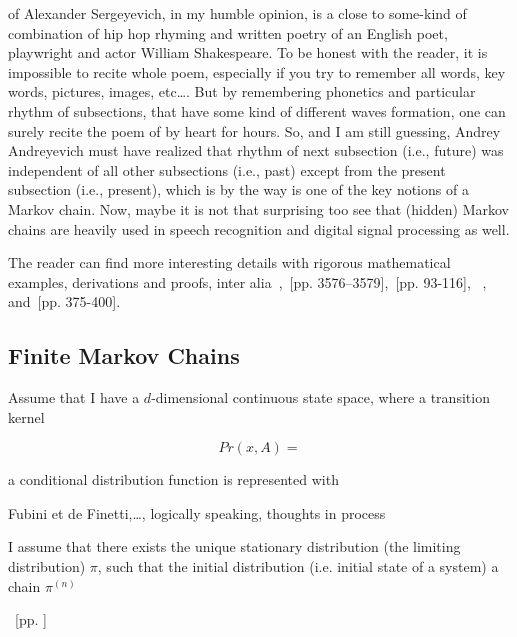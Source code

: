 \documentclass[a4paper,11pt,english]{article}
\begin{document}
		of Alexander Sergeyevich, in my humble opinion, is a close  to some-kind of combination of hip hop rhyming and written poetry of an English poet, 
		playwright and actor William Shakespeare. To be honest with the reader, it is impossible to recite whole poem, especially if you try to remember 
		all words, key words, pictures, images, etc\ldots. But by remembering phonetics and particular rhythm of subsections, that have some kind of 
		different waves formation, one can surely recite the poem of by heart for hours.  So, and I am still guessing, Andrey Andreyevich must have 
		realized that rhythm of next subsection (i.e., future) was independent of all other subsections (i.e., past) except from the present subsection 
		(i.e., present), which is by the way is one of the key notions of a Markov chain. Now, maybe it is not that surprising too see that (hidden) Markov 
		chains are heavily used in speech recognition and digital signal processing as well. 
		
		The reader can find more interesting details with rigorous mathematical examples, derivations and proofs, 
		inter alia~\cite{chib},~\cite{chib1}[pp. 3576--3579],~\cite{gamerman}[pp. 93-116], ~\citep[p. 246]{lee}, and~\cite{monahan}[pp. 375-400]. 

	
		\subsection{Finite Markov Chains} 

		
		Assume that I have a $d$-dimensional continuous state space, where a transition kernel 

		\begin{equation*}
			Pr(x, A) = 
		\end{equation*}
	
		a conditional distribution function is represented with 

		Fubini et de Finetti,\ldots, logically speaking, thoughts in process 
	
		I assume that there exists the unique stationary distribution (the limiting distribution) $\pi$, such that the initial distribution 
		(i.e. initial state of a system) a chain $\pi^{\left(n\right)}$  

		~\cite{lawler}[pp. ]


\end{document}
